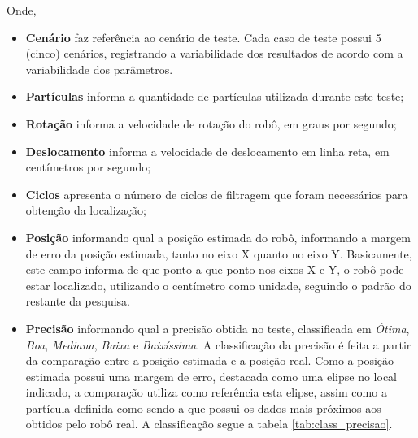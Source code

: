 Onde,
\begin{itemize}
  \item \textbf{Cenário} faz referência ao cenário de teste. Cada caso de teste possui 5 (cinco) cenários, registrando a variabilidade
  dos resultados de acordo com a variabilidade dos parâmetros.

  \item \textbf{Partículas} informa a quantidade de partículas utilizada durante este teste;

  \item \textbf{Rotação} informa a velocidade de rotação do robô, em graus por segundo;

  \item \textbf{Deslocamento} informa a velocidade de deslocamento em linha reta, em centímetros por segundo;

  \item \textbf{Ciclos} apresenta o número de ciclos de filtragem que foram necessários para obtenção da localização;

  \item \textbf{Posição} informando qual a posição estimada do robô, informando a margem de erro da posição estimada, tanto no eixo X
  quanto no eixo Y. Basicamente, este campo informa de que ponto a que ponto nos eixos X e Y, o robô pode estar localizado, utilizando o
  centímetro como unidade, seguindo o padrão do restante da pesquisa.

  \item \textbf{Precisão} informando qual a precisão obtida no teste, classificada em \textit{Ótima}, \textit{Boa}, \textit{Mediana},
  \textit{Baixa} e \textit{Baixíssima}. A classificação da precisão é feita a partir da comparação entre a posição estimada e a posição real.
  Como a posição estimada possui uma margem de erro, destacada como uma elipse no local indicado, a comparação utiliza como referência
  esta elipse, assim como a partícula definida como sendo a que possui os dados mais próximos aos obtidos pelo robô real. A classificação
  segue a tabela \ref{tab:class_precisao}.


\end{itemize}
